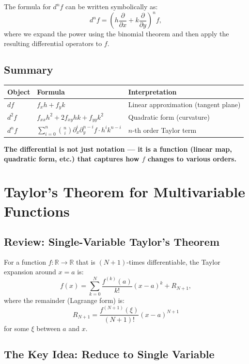 \documentclass[11pt]{report}
\newcommand{\R}{\mathbb{R}}
\begin{document}
\begin{remark}
The formula for $d^n f$ can be written symbolically as:
\[
d^n f = \left( h \frac{\partial}{\partial x} + k \frac{\partial}{\partial y} \right)^n f,
\]
where we expand the power using the binomial theorem and then apply the resulting differential operators to $f$.
\end{remark}

\subsection*{Summary}

\begin{center}
\begin{tabular}{|l|l|l|}
\hline
\textbf{Object} & \textbf{Formula} & \textbf{Interpretation} \\
\hline
$df$ & $f_x h + f_y k$ & Linear approximation (tangent plane) \\
\hline
$d^2f$ & $f_{xx} h^2 + 2f_{xy} hk + f_{yy} k^2$ & Quadratic form (curvature) \\
\hline
$d^n f$ & $\displaystyle\sum_{i=0}^{n} \binom{n}{i} \partial_x^i \partial_y^{n-i} f \cdot h^i k^{n-i}$ & $n$-th order Taylor term \\
\hline
\end{tabular}
\end{center}

\textbf{The differential is not just notation --- it is a function (linear map, quadratic form, etc.) that captures how $f$ changes to various orders.}

\section{Taylor's Theorem for Multivariable Functions}

\subsection*{Review: Single-Variable Taylor's Theorem}

For a function $f: \R \to \R$ that is $(N+1)$-times differentiable, the Taylor expansion around $x = a$ is:
\[
f(x) = \sum_{k=0}^{N} \frac{f^{(k)}(a)}{k!}(x - a)^k + R_{N+1},
\]
where the remainder (Lagrange form) is:
\[
R_{N+1} = \frac{f^{(N+1)}(\xi)}{(N+1)!}(x - a)^{N+1}
\]
for some $\xi$ between $a$ and $x$.

\subsection*{The Key Idea: Reduce to Single Variable}
\end{document}
